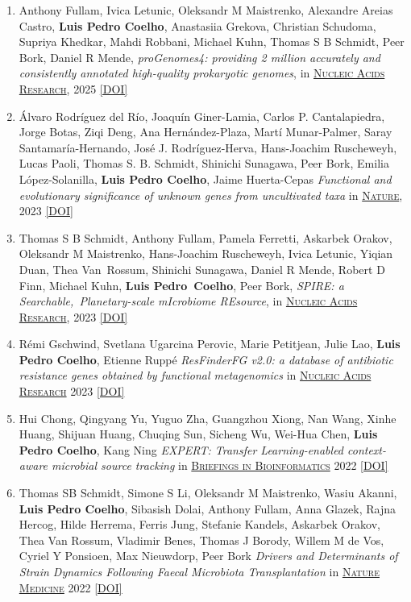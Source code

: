 \documentclass{article}
\newcommand\showdoi[1]{%
    \href{https://doi.org/#1}{[DOI]}%
}
\newcommand\pubname[1]{\textsc{\uline{#1}}}
\begin{document}
\begin{enumerate}[resume]
\item Anthony Fullam, Ivica Letunic, Oleksandr M Maistrenko, Alexandre Areias Castro, \textbf{Luis Pedro Coelho}, Anastasiia Grekova, Christian Schudoma, Supriya Khedkar, Mahdi Robbani, Michael Kuhn, Thomas S B Schmidt, Peer Bork, Daniel R Mende, \emph{proGenomes4: providing 2 million accurately and consistently annotated high-quality prokaryotic genomes}, in \pubname{Nucleic Acids Research}, 2025 \showdoi{10.1093/nar/gkaf1208}

\item Álvaro Rodríguez del Río, Joaquín Giner-Lamia, Carlos P. Cantalapiedra, Jorge Botas, Ziqi Deng, Ana Hernández-Plaza, Martí Munar-Palmer, Saray Santamaría-Hernando, José J. Rodríguez-Herva, Hans-Joachim Ruscheweyh, Lucas Paoli, Thomas S. B. Schmidt, Shinichi Sunagawa, Peer Bork, Emilia López-Solanilla, \textbf{Luis Pedro Coelho}, Jaime Huerta-Cepas \emph{Functional and evolutionary significance of unknown genes from uncultivated taxa} in \pubname{Nature}, 2023 \showdoi{10.1038/s41586-023-06955-z}

\item Thomas S B Schmidt, Anthony Fullam, Pamela Ferretti, Askarbek Orakov, Oleksandr M Maistrenko, Hans-Joachim Ruscheweyh, Ivica Letunic, Yiqian Duan, Thea Van Rossum, Shinichi Sunagawa, Daniel R Mende, Robert D Finn, Michael Kuhn, \textbf{Luis Pedro Coelho}, Peer Bork, \emph{SPIRE: a Searchable, Planetary-scale mIcrobiome REsource}, in \pubname{Nucleic Acids Research}, 2023 \showdoi{10.1093/nar/gkad943}

\item Rémi Gschwind, Svetlana Ugarcina Perovic, Marie Petitjean, Julie Lao, \textbf{Luis Pedro Coelho}, Etienne Ruppé \emph{ResFinderFG v2.0: a database of antibiotic resistance genes obtained by functional metagenomics} in \pubname{Nucleic Acids Research} 2023 \showdoi{10.1093/nar/gkad384}

\item Hui Chong, Qingyang Yu, Yuguo Zha, Guangzhou Xiong, Nan Wang, Xinhe Huang, Shijuan Huang, Chuqing Sun, Sicheng Wu, Wei-Hua Chen, \textbf{Luis Pedro Coelho}, Kang Ning \emph{EXPERT: Transfer Learning-enabled context-aware microbial source tracking} in \pubname{Briefings in Bioinformatics} 2022 \showdoi{10.1093/bib/bbac396}

\item Thomas SB Schmidt, Simone S Li, Oleksandr M Maistrenko, Wasiu Akanni, \textbf{Luis Pedro Coelho}, Sibasish Dolai, Anthony Fullam, Anna Glazek, Rajna Hercog, Hilde Herrema, Ferris Jung, Stefanie Kandels, Askarbek Orakov, Thea Van Rossum, Vladimir Benes, Thomas J Borody, Willem M de Vos, Cyriel Y Ponsioen, Max Nieuwdorp, Peer Bork \emph{Drivers and Determinants of Strain Dynamics Following Faecal Microbiota Transplantation} in \pubname{Nature Medicine} 2022 \showdoi{10.1038/s41591-022-01913-0}


\end{enumerate}
\end{document}
